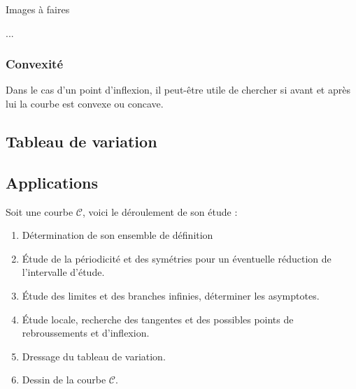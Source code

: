 Images à faires
\begin{ex}
...
\end{ex}

\subsubsection{Convexité}
Dans le cas d'un point d'inflexion, il peut-être utile de chercher si avant et après lui la courbe est convexe ou concave.
\subsection{Tableau de variation}
\subsection{Applications}
\begin{meth}
Soit une courbe $\mathscr{C}$, voici le déroulement de son étude :
\begin{enumerate}
    \item Détermination de son ensemble de définition
    \item Étude de la périodicité et des symétries pour un éventuelle réduction de l'intervalle d'étude.
    \item Étude des limites et des branches infinies, déterminer les asymptotes.
    \item Étude locale, recherche des tangentes et des possibles points de rebroussements et d'inflexion.
    \item Dressage du tableau de variation.
    \item Dessin de la courbe $\mathscr{C}$.
\end{enumerate}
\end{meth}
